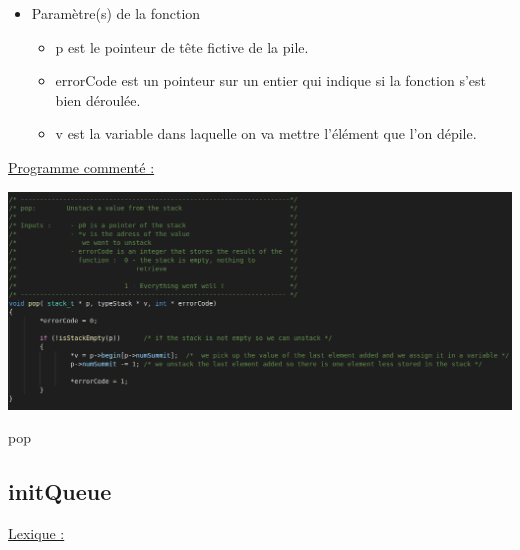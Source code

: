 \documentclass[a4paper]{article}
\begin{document}
\begin{itemize}

\item Paramètre(s) de la fonction  

\begin{itemize}

\item p est le pointeur de tête fictive de la pile.

\item errorCode est un pointeur sur un entier qui indique si la fonction s'est bien déroulée.

\item v est la variable dans laquelle on va mettre l'élément que l'on dépile.

\end{itemize}
\end{itemize}
\underline{Programme commenté :}
\begin{center}
\includegraphics[scale=0.4]{pop.png}

pop
\end{center}
\subsection{initQueue}
\underline{Lexique :}
\end{document}
